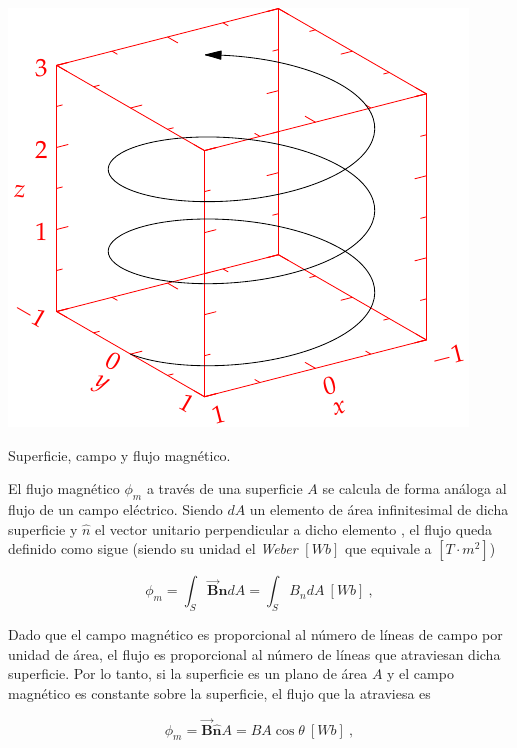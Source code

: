 \documentclass{tufte-handout}
\begin{document}
\begin{marginfigure}%
    \includegraphics[width=\linewidth]{helix}
    \caption{Superficie, campo y flujo magnético.}
    \label{fig:flujomagnetico}
\end{marginfigure}

El flujo magnético $\phi_m$ a través de una superficie $A$ se calcula de forma análoga al flujo de un campo eléctrico. Siendo $dA$ un elemento de área infinitesimal de dicha superficie y $\hat{n}$ el vector unitario perpendicular a dicho elemento , el flujo queda definido como sigue (siendo su unidad el \emph{Weber} $[Wb]$ que equivale a $[T\cdot m^2]$)

\begin{equation}
\phi_m = \int_{S} \mathbf{\vec{B}}\mathbf{\hat{n}}dA = \int_{S}B_ndA ~ [Wb]~, 
\end{equation}

Dado que el campo magnético es proporcional al número de líneas de campo por unidad de área, el flujo es proporcional al número de líneas que atraviesan dicha superficie. Por lo tanto, si la superficie es un plano de área $A$ y el campo magnético es constante sobre la superficie, el flujo que la atraviesa es

\begin{equation}
\phi_m = \mathbf{\vec{B}}\mathbf{\hat{n}}A = BA\cos{\theta} ~ [Wb]~,
\end{equation}
\end{document}
